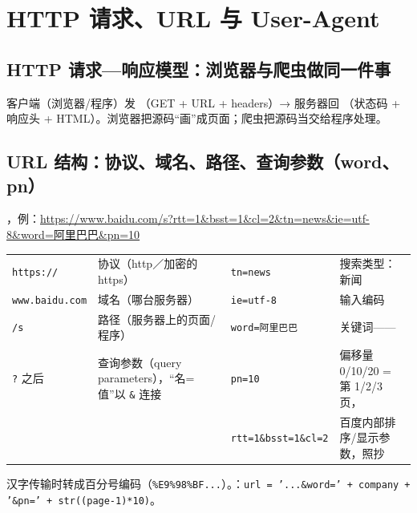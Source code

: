\section{HTTP 请求、URL 与 User-Agent}

\subsection{HTTP 请求—响应模型：浏览器与爬虫做同一件事}
客户端（浏览器/程序）发 （GET + URL + headers）→ 服务器回 （状态码 + 响应头 + HTML）。浏览器把源码“画”成页面；爬虫把源码当交给程序处理。

\subsection{URL 结构：协议、域名、路径、查询参数（word、pn）}
，例：\url{https://www.baidu.com/s?rtt=1&bsst=1&cl=2&tn=news&ie=utf-8&word=阿里巴巴&pn=10}
\begin{center}\footnotesize\renewcommand{\arraystretch}{1.0}
\begin{tabularx}{\linewidth}{@{}p{2.5cm}Lp{2.6cm}L@{}}
\toprule
\texttt{https://} & 协议（http／加密的 https）& \texttt{tn=news} & 搜索类型：新闻 \\
\texttt{www.baidu.com} & 域名（哪台服务器）& \texttt{ie=utf-8} & 输入编码 \\
\texttt{/s} & 路径（服务器上的页面/程序）& \texttt{word=阿里巴巴} & 关键词—— \\
\texttt{?} 之后 & 查询参数（query parameters），“名=值”以 \texttt{\&} 连接 & \texttt{pn=10} & 偏移量 0/10/20 = 第 1/2/3 页， \\
& & \texttt{rtt=1\&bsst=1\&cl=2} & 百度内部排序/显示参数，照抄 \\
\bottomrule
\end{tabularx}
\end{center}
汉字传输时转成百分号编码（\texttt{\%E9\%98\%BF...}）。：\texttt{url = '...\&word=' + company + '\&pn=' + str((page-1)*10)}。

